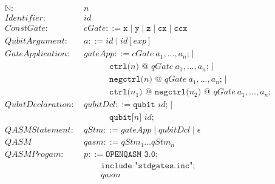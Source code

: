 \begin{align*}
    \mathbb{N}: \ & n \\
    Identifier: \ & id \\
    ConstGate: \ & cGate ::= \texttt{x} \mid \texttt{y} \mid \texttt{z} \mid \texttt{cx} \mid \texttt{ccx}\\
    QubitArgument: \ & a ::= id \mid id[exp]\\
    GateApplication: \ & gateApp::= cGate \ a_1, ..., a_n \texttt{;} \mid\\
    & \quad \quad \quad \texttt{ctrl(}n\texttt{)} \texttt{ @ } qGate \ a_1, ..., a_n \texttt{;} \mid\\
    & \quad \quad \quad \texttt{negctrl(}n\texttt{)} \texttt{ @ } qGate \ a_1, ..., a_n \texttt{;} \mid\\
    & \quad \quad \quad \texttt{ctrl(}n_1\texttt{)} \texttt{ @ } \texttt{negctrl(}n_2\texttt{)} \texttt{ @ } qGate \ a_1, ..., a_n \texttt{;}\\
    QubitDeclaration: \ & qubitDcl::= \texttt{qubit } id \texttt{;} \mid\\
    & \quad \quad \quad \texttt{qubit[}n\texttt{] } id \texttt{;}\\
    QASMStatement: \ & qStm::= gateApp \mid qubitDcl \mid \epsilon\\
    QASM \ & qasm ::= qStm_1 \dots qStm_n\\
    QASMProgam: \ & p ::= \texttt{OPENQASM 3.0;}\\
            & \quad \quad \texttt{include "stdgates.inc";}\\
            & \quad \quad qasm
\end{align*}